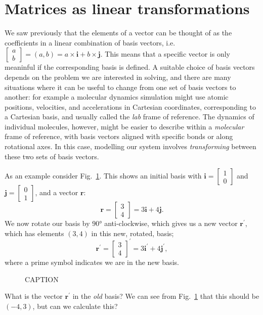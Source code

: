 \documentclass[a4paper]{article}
\newcommand{\bvec}[1]{\mathbf{#1}}
\newcommand{\cvec}[2]{\begin{bmatrix}#1\\#2\end{bmatrix}}
\begin{document}
\section{Matrices as linear transformations}

We saw previously that the elements of a vector can be thought of as the coefficients in a linear combination of basis vectors, i.e.~ $\begin{bmatrix}a\\b\end{bmatrix}=(a, b)=a\times\bvec{i}+b\times\bvec{j}$. This means that a specific vector is only meaninful if the corresponding basis is defined. A suitable choice of basis vectors depends on the problem we are interested in solving, and there are many situations where it can be useful to change from one set of basis vectors to another: for example a molecular dynamics simulation might use atomic positions, velocities, and accelerations in Cartesian coordinates, corresponding to a Cartesian basis, and usually called the \emph{lab} frame of reference. The dynamics of individual molecules, however, might be easier to describe within a \emph{molecular} frame of reference, with basis vectors aligned with specific bonds or along rotational axes. In this case, modelling our system involves \emph{transforming} between these two sets of basis vectors.

As an example consider Fig.~\ref{fig:rotation_example}. This shows an initial  basis with $\bvec{i}=\cvec{1}{0}$ and $\bvec{j}=\cvec{0}{1}$, and a vector $\bvec{r}$:
\begin{equation*}
\bvec{r}=\cvec{3}{4}=3\bvec{i}+4\bvec{j}. 
\end{equation*}
We now rotate our basis by $\ang{90}$ anti-clockwise, which gives us a new vector $\bvec{r^\prime}$, which has elements $(3,4)$ in this new, rotated, basis;
\begin{equation*}
\bvec{r^\prime}=\cvec{3}{4}^\prime=3\bvec{i^\prime}+4\bvec{j^\prime},
\end{equation*}
where a prime symbol indicates we are in the new basis.
\begin{figure}[tb]
  \centering
    \caption{\label{fig:rotation_example}CAPTION}
\end{figure}
What is the vector $\bvec{r^\prime}$ in the \emph{old} basis? We can see from Fig.~\ref{fig:rotation_example} that this should be $(-4,3)$, but can we calculate this?
\end{document}
